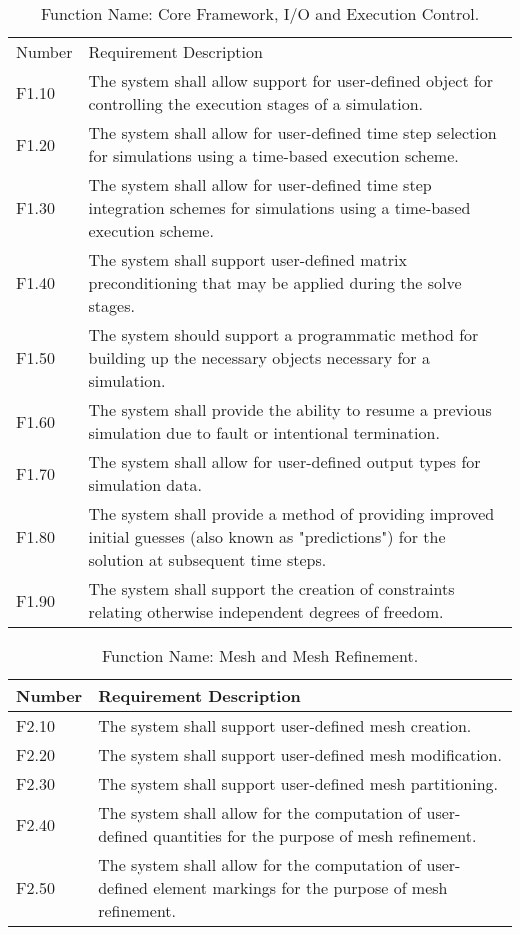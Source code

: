 \documentclass{INLreport}
\begin{document}
\begin{table}[!htbp]
  \caption{Function Name: Core Framework, I/O and Execution Control.\label{tab:core}}
  \begin{tabular}{|l|p{12cm}|}
    \rowcolor{gray}
    Number & Requirement Description \\
    F1.10 & The system shall allow support for user-defined object for controlling the execution stages of a simulation. \\ \hline
    F1.20 & The system shall allow for user-defined time step selection for simulations using a time-based execution scheme. \\ \hline
    F1.30 & The system shall allow for user-defined time step integration schemes for simulations using a time-based execution scheme. \\ \hline
    F1.40 & The system shall support user-defined matrix preconditioning that may be applied during the solve stages. \\ \hline
    F1.50 & The system should support a programmatic method for building up the necessary objects necessary for a simulation. \\ \hline
    F1.60 & The system shall provide the ability to resume a previous simulation due to fault or intentional termination. \\ \hline
    F1.70 & The system shall allow for user-defined output types for simulation data. \\ \hline
    F1.80 & The system shall provide a method of providing improved initial guesses (also known as "predictions") for the solution at subsequent time steps. \\ \hline
    F1.90 & The system shall support the creation of constraints relating otherwise independent degrees of freedom. \\ \hline
  \end{tabular}
\end{table}

\begin{table}[!htbp]
  \caption{Function Name: Mesh and Mesh Refinement.\label{tab:core}}
  \begin{tabular}{|l|p{12cm}|}
    \rowcolor{gray}
    Number & Requirement Description \\ \hline
    F2.10 & The system shall support user-defined mesh creation. \\ \hline
    F2.20 & The system shall support user-defined mesh modification. \\ \hline
    F2.30 & The system shall support user-defined mesh partitioning. \\ \hline
    F2.40 & The system shall allow for the computation of user-defined quantities for the purpose of mesh refinement. \\ \hline
    F2.50 & The system shall allow for the computation of user-defined element markings for the purpose of mesh refinement. \\ \hline
  \end{tabular}
\end{table}
\end{document}
